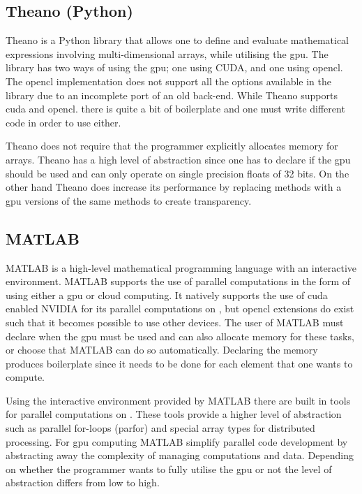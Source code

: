 \subsection{Theano (Python)}
Theano is a Python library that allows one to define and evaluate mathematical expressions involving multi-dimensional arrays, while utilising the \acrshort{gpu}.
The library has two ways of using the \acrshort{gpu}; one using CUDA, and one using \gls{opencl}.
The \gls{opencl} implementation does not support all the options available in the library due to an incomplete port of an old back-end.
While Theano supports \gls{cuda} and \gls{opencl}. there is quite a bit of boilerplate and one must write different code in order to use either.

Theano does not require that the programmer explicitly allocates memory for arrays.
Theano has a high level of abstraction since one has to declare if the \acrshort{gpu} should be used and can only operate on single precision floats of 32 bits.
On the other hand Theano does increase its performance by replacing methods with a \acrshort{gpu} versions of the same methods to create transparency. \citep{Theano,Theano_GPU,bergstratheano, LEGB}

\subsection{MATLAB}
MATLAB is a high-level mathematical programming language with an interactive environment.
MATLAB supports the use of parallel computations in the form of using either a \acrshort{gpu} or cloud computing.
It natively supports the use of \gls{cuda} enabled NVIDIA  for its parallel computations on , but \gls{opencl} extensions do exist such that it becomes possible to use other devices.
The user of MATLAB must declare when the \acrshort{gpu} must be used and can also allocate memory for these tasks, or choose that MATLAB can do so automatically.
Declaring the memory produces boilerplate since it needs to be done for each element that one wants to compute. \citep{MATLAB_backend,MATLAB_benchmark}

Using the interactive environment provided by MATLAB there are built in tools for parallel computations on .
These tools provide a higher level of abstraction such as parallel for-loops (parfor) and special array types for distributed processing.
For \acrshort{gpu} computing MATLAB simplify parallel code development by abstracting away the complexity of managing computations and data. \citep{MATLAB_parallel}
Depending on whether the programmer wants to fully utilise the \acrshort{gpu} or not the level of abstraction differs from low to high.

